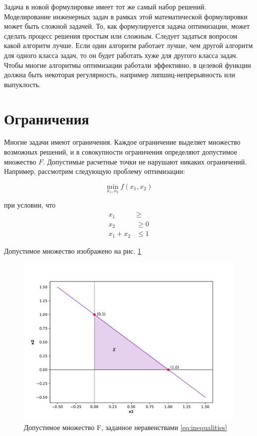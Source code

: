 Задача в новой формулировке имеет тот же самый набор решений. Моделирование инженерных задач в рамках этой математической формулировки может быть сложной задачей. То, как формулируется задача оптимизации, может сделать процесс решения простым или сложным. Следует задаться вопросом какой алгоритм лучше. Если один алгоритм работает лучше, чем другой алгоритм для одного класса задач, то он будет работать хуже для другого класса задач. Чтобы многие алгоритмы оптимизации работали эффективно, в целевой функции должна быть некоторая регулярность, например липшиц-непрерывность или выпуклость. 

\section{Ограничения}

Многие задачи имеют ограничения. Каждое ограничение выделяет множество возможных решений, и в совокупности ограничения определяют допустимое множество  $F$. Допустимые расчетные точки не нарушают никаких ограничений. \cite{kochenderfer2020optimization} Например, рассмотрим следующую проблему оптимизации:

\begin{equation}
\min_{x_1, x_2} f(x_1, x_2)
\label{eq:taskOptimizationX1X2}
\end{equation}


 \begin{center}
 при условии, что 
\begin{equation}
  \begin{aligned}
    x_1 &\geq  \\
    x_2 &\geq 0  \\
    x_1 + x_2 &\leq 1
  \end{aligned}
  \label{eq:inequalities}
\end{equation}
\end{center}

Допустимое множество изображено на рис. \ref{fig:figure_2}

\begin{figure}[ht]
 \centering
		\includegraphics[height = 10 cm, keepaspectratio]{../assets/images/Figure_2.pdf}
		\caption{Допустимое множество F, заданное неравенствами \eqref{eq:inequalities}}
		\label{fig:figure_2}
	\end{figure}
    
